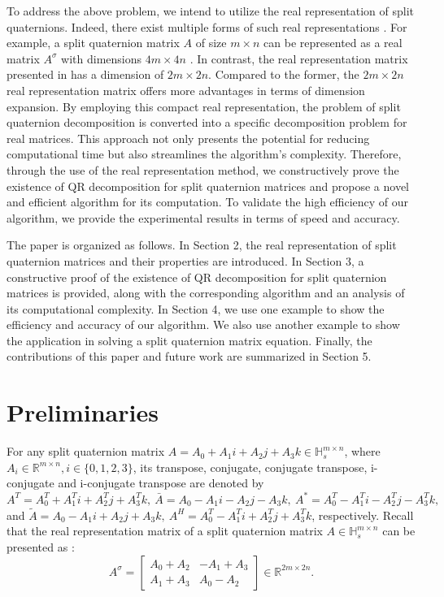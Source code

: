 \documentclass[12pt]{article}
\numberwithin{equation}{section}
\begin{document}
To address the above problem, we intend to utilize the real representation of split quaternions. Indeed, there exist multiple forms of such real representations \citep{Zhuo2020, Yang2020, Xin2019, Gang2024}. For example,  a split quaternion matrix $A$ of size $m \times n$  can be represented as a real matrix $A^\sigma$ 
  with dimensions $4m \times 4n$ \citep{Xin2019}. In contrast, the real representation matrix presented in \cite{Gang2024} has a dimension of $2m \times 2n$. Compared to the former, the $2m \times 2n$ real representation matrix offers more advantages in terms of dimension expansion. By employing this compact real representation, the  problem of split quaternion decomposition is converted into a specific decomposition problem for real matrices. This approach not only presents the potential for reducing computational time but also streamlines the algorithm's complexity. Therefore, through the use of the real representation method, 
we constructively prove the existence of QR decomposition for split quaternion matrices and propose a novel and efficient algorithm for its computation. To validate the high efficiency of our algorithm, we provide the experimental results in terms of speed and accuracy.

The paper is organized as follows. In Section 2, the real representation of split quaternion matrices and their properties are introduced. In Section 3, a constructive proof of the existence of QR decomposition for split quaternion matrices is provided, along with the corresponding algorithm and an analysis of its computational complexity. In Section 4, we use one example to show the efficiency and accuracy of our algorithm. We also use another example to show the application in solving a split quaternion matrix equation. Finally, the contributions of this paper and future work are summarized in Section 5.


\section{Preliminaries}
For any split quaternion matrix ${A}=A_{0}+A_{1}i + A_{2}j + A_{3}k \in\mathbb{H}_{s}^{m\times n}$, where $A_{i}\in\mathbb{R}^{m\times n}, i\in\{0,1,2,3\}$, its transpose, conjugate, conjugate transpose, i-conjugate and i-conjugate transpose are  denoted by 
 ${A}^T = A_0^T + A_1^Ti + A_2^Tj + A_3^Tk, \ \bar{{A}} = A_0 - A_1i - A_2j - A_3k, \ {A}^* = A_0^T - A_1^Ti - A_2^Tj - A_3^Tk,$ and
 $\tilde{A} = A_0 - A_1i + A_2j + A_3k, \ {A}^H = A_0^T - A_1^Ti + A_2^Tj + A_3^Tk$, respectively. Recall that the real representation matrix of a split quaternion matrix $A \in\mathbb{H}_{s}^{m\times n}$ can be presented as \citep{TJiang2018, Gang2024}:
\begin{equation}\label{eq:2.1}
A^\sigma = \begin{bmatrix} A_0 + A_2 & -A_1 + A_3 \\ A_1 + A_3 & A_0 - A_2 \end{bmatrix} \in \mathbb{R}^{2m \times 2n}.
\end{equation}
\end{document}
